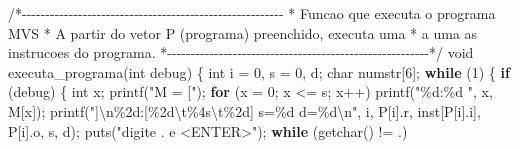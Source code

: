 \documentclass[
  brazilian,
  letterpaper,
]{book}
\newenvironment{Shaded}{\begin{snugshade}}{\end{snugshade}}
\newcommand{\CharTok}[1]{\textcolor[rgb]{0.13,0.47,0.30}{#1}}
\newcommand{\CommentTok}[1]{\textcolor[rgb]{0.37,0.37,0.37}{#1}}
\newcommand{\ControlFlowTok}[1]{\textcolor[rgb]{0.00,0.23,0.31}{\textbf{#1}}}
\newcommand{\DataTypeTok}[1]{\textcolor[rgb]{0.68,0.00,0.00}{#1}}
\newcommand{\DecValTok}[1]{\textcolor[rgb]{0.68,0.00,0.00}{#1}}
\newcommand{\NormalTok}[1]{\textcolor[rgb]{0.00,0.23,0.31}{#1}}
\newcommand{\OperatorTok}[1]{\textcolor[rgb]{0.37,0.37,0.37}{#1}}
\newcommand{\SpecialCharTok}[1]{\textcolor[rgb]{0.37,0.37,0.37}{#1}}
\newcommand{\StringTok}[1]{\textcolor[rgb]{0.13,0.47,0.30}{#1}}
\theoremstyle{plain}
\theoremstyle{definition}
\theoremstyle{remark}
\begin{document}
\begin{Shaded}
\begin{Highlighting}[]
\CommentTok{/*{-}{-}{-}{-}{-}{-}{-}{-}{-}{-}{-}{-}{-}{-}{-}{-}{-}{-}{-}{-}{-}{-}{-}{-}{-}{-}{-}{-}{-}{-}{-}{-}{-}{-}{-}{-}{-}{-}{-}{-}{-}{-}{-}{-}{-}{-}{-}{-}{-}{-}{-}{-}{-}{-}{-}{-}}
\CommentTok{ * Funcao que executa o programa MVS}
\CommentTok{ * A partir do vetor P (programa) preenchido, executa uma}
\CommentTok{ * a uma as instrucoes do programa.                      }
\CommentTok{ *{-}{-}{-}{-}{-}{-}{-}{-}{-}{-}{-}{-}{-}{-}{-}{-}{-}{-}{-}{-}{-}{-}{-}{-}{-}{-}{-}{-}{-}{-}{-}{-}{-}{-}{-}{-}{-}{-}{-}{-}{-}{-}{-}{-}{-}{-}{-}{-}{-}{-}{-}{-}{-}{-}{-}{-}*/}
\DataTypeTok{void}\NormalTok{ executa\_programa}\OperatorTok{(}\DataTypeTok{int}\NormalTok{ debug}\OperatorTok{)}
\OperatorTok{\{}
    \DataTypeTok{int}\NormalTok{ i }\OperatorTok{=} \DecValTok{0}\OperatorTok{,}\NormalTok{ s }\OperatorTok{=} \DecValTok{0}\OperatorTok{,}\NormalTok{ d}\OperatorTok{;}
    \DataTypeTok{char}\NormalTok{ numstr}\OperatorTok{[}\DecValTok{6}\OperatorTok{];}
    \ControlFlowTok{while} \OperatorTok{(}\DecValTok{1}\OperatorTok{)}
    \OperatorTok{\{}
        \ControlFlowTok{if} \OperatorTok{(}\NormalTok{debug}\OperatorTok{)}
        \OperatorTok{\{}
            \DataTypeTok{int}\NormalTok{ x}\OperatorTok{;}
\NormalTok{            printf}\OperatorTok{(}\StringTok{"M = ["}\OperatorTok{);}
            \ControlFlowTok{for} \OperatorTok{(}\NormalTok{x }\OperatorTok{=} \DecValTok{0}\OperatorTok{;}\NormalTok{ x }\OperatorTok{\textless{}=}\NormalTok{ s}\OperatorTok{;}\NormalTok{ x}\OperatorTok{++)}
\NormalTok{                printf}\OperatorTok{(}\StringTok{"}\SpecialCharTok{\%d}\StringTok{:}\SpecialCharTok{\%d}\StringTok{ "}\OperatorTok{,}\NormalTok{ x}\OperatorTok{,}\NormalTok{ M}\OperatorTok{[}\NormalTok{x}\OperatorTok{]);}
\NormalTok{            printf}\OperatorTok{(}\StringTok{"]}\SpecialCharTok{\textbackslash{}n\%2d}\StringTok{:[}\SpecialCharTok{\%2d\textbackslash{}t\%4s\textbackslash{}t\%2d}\StringTok{]  s=}\SpecialCharTok{\%d}\StringTok{  d=}\SpecialCharTok{\%d\textbackslash{}n}\StringTok{"}\OperatorTok{,} 
\NormalTok{                        i}\OperatorTok{,}\NormalTok{ P}\OperatorTok{[}\NormalTok{i}\OperatorTok{].}\NormalTok{r}\OperatorTok{,}\NormalTok{ inst}\OperatorTok{[}\NormalTok{P}\OperatorTok{[}\NormalTok{i}\OperatorTok{].}\NormalTok{i}\OperatorTok{],}\NormalTok{ P}\OperatorTok{[}\NormalTok{i}\OperatorTok{].}\NormalTok{o}\OperatorTok{,}\NormalTok{ s}\OperatorTok{,}\NormalTok{ d}\OperatorTok{);}
\NormalTok{            puts}\OperatorTok{(}\StringTok{"digite . e \textless{}ENTER\textgreater{}"}\OperatorTok{);}
            \ControlFlowTok{while} \OperatorTok{(}\NormalTok{getchar}\OperatorTok{()} \OperatorTok{!=} \CharTok{\textquotesingle{}.\textquotesingle{}}\OperatorTok{)}

\end{Highlighting}
\end{Shaded}
\end{document}
